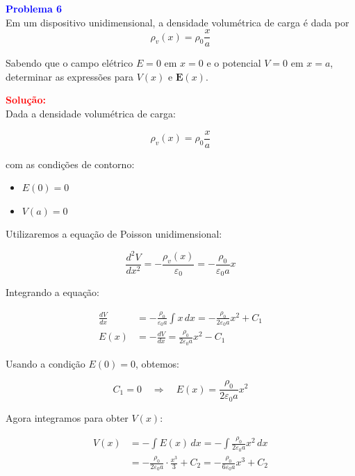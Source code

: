 \documentclass[a4paper,12pt]{article}
\begin{document}
\begin{flushleft}
\textbf{\textcolor{blue}{\Large Problema 6}}\\

Em um dispositivo unidimensional, a densidade volumétrica de carga é dada por
\begin{equation}
\rho_v(x) = \rho_0 \frac{x}{a}
\end{equation}

\noindent
Sabendo que o campo elétrico \( E = 0 \) em \( x = 0 \) e o potencial \( V = 0 \) em \( x = a \), 
determinar as expressões para \( V(x) \) e \( \mathbf{E}(x) \).

\textcolor{red}{\textbf{Solução:}}\\


Dada a densidade volumétrica de carga:

\begin{equation}
\rho_v(x) = \rho_0 \frac{x}{a}
\end{equation}

\noindent
com as condições de contorno:
\begin{itemize}
    \item \( E(0) = 0 \)
    \item \( V(a) = 0 \)
\end{itemize}

\noindent
Utilizaremos a equação de Poisson unidimensional:

\begin{equation}
\frac{d^2 V}{dx^2} = -\frac{\rho_v(x)}{\varepsilon_0} = -\frac{\rho_0}{\varepsilon_0 a} x
\end{equation}

Integrando a equação:

\begin{align}
\frac{dV}{dx} &= -\frac{\rho_0}{\varepsilon_0 a} \int x \, dx = -\frac{\rho_0}{2\varepsilon_0 a} x^2 + C_1 \\
E(x) &= -\frac{dV}{dx} = \frac{\rho_0}{2\varepsilon_0 a} x^2 - C_1
\end{align}

Usando a condição \( E(0) = 0 \), obtemos:

\begin{equation}
C_1 = 0 \quad \Rightarrow \quad \boxed{E(x) = \frac{\rho_0}{2\varepsilon_0 a} x^2}
\end{equation}

Agora integramos para obter \( V(x) \):

\begin{align}
V(x) &= -\int E(x)\, dx = -\int \frac{\rho_0}{2\varepsilon_0 a} x^2 \, dx \\
&= -\frac{\rho_0}{2\varepsilon_0 a} \cdot \frac{x^3}{3} + C_2 = -\frac{\rho_0}{6\varepsilon_0 a} x^3 + C_2
\end{align}


\end{flushleft}
\end{document}

